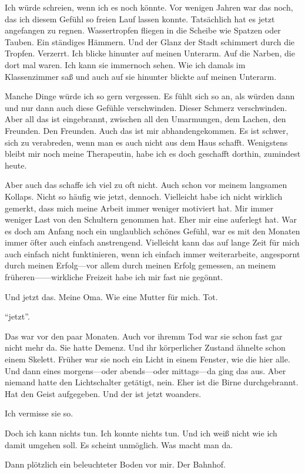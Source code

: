 \documentclass{article}
\begin{document}
	\medskip

	Ich würde schreien, wenn ich es noch könnte. Vor wenigen Jahren war das noch, das ich diesem Gefühl so freien Lauf lassen konnte. Tatsächlich hat es jetzt angefangen zu regnen. Wassertropfen fliegen in die Scheibe wie Spatzen oder Tauben. Ein ständiges Hämmern. Und der Glanz der Stadt schimmert durch die Tropfen. Verzerrt. Ich blicke hinunter auf meinen Unterarm. Auf die Narben, die dort mal waren. Ich kann sie immernoch sehen. Wie ich damals im Klassenzimmer saß und auch auf sie hinunter blickte auf meinen Unterarm.

	\medskip

	Manche Dinge würde ich so gern vergessen. Es fühlt sich so an, als würden dann und nur dann auch diese Gefühle verschwinden. Dieser Schmerz verschwinden. Aber all das ist eingebrannt, zwischen all den Umarmungen, dem Lachen, den Freunden. Den Freunden. Auch das ist mir abhandengekommen. Es ist schwer, sich zu verabreden, wenn man es auch nicht aus dem Haus schafft. Wenigstens bleibt mir noch meine Therapeutin, habe ich es doch geschafft dorthin, zumindest heute.

	\medskip

	Aber auch das schaffe ich viel zu oft nicht. Auch schon vor meinem langsamen Kollaps. Nicht so häufig wie jetzt, dennoch. Vielleicht habe ich nicht wirklich gemerkt, dass mich meine Arbeit immer weniger motiviert hat. Mir immer weniger Last von den Schultern genommen hat. Eher mir eine auferlegt hat. War es doch am Anfang noch ein unglaublich schönes Gefühl, war es mit den Monaten immer öfter auch einfach anstrengend. Vielleicht kann das auf lange Zeit für mich auch einfach nicht funktinieren, wenn ich einfach immer weiterarbeite, angespornt durch meinen Erfolg—vor allem durch meinen Erfolg gemessen, an meinem früheren——wirkliche Freizeit habe ich mir fast nie gegönnt.

	\medskip

	Und jetzt das. Meine Oma. Wie eine Mutter für mich. Tot. 

	\medskip

	\enquote{jetzt}.

	\medskip

	Das war vor den paar Monaten. Auch vor ihremm Tod war sie schon fast gar nicht mehr da. Sie hatte Demenz. Und ihr körperlicher Zustand ähnelte schon einem Skelett. Früher war sie noch ein Licht in einem Fenster, wie die hier alle. Und dann eines morgens—oder abends—oder mittags—da ging das aus. Aber niemand hatte den Lichtschalter getätigt, nein. Eher ist die Birne durchgebrannt. Hat den Geist aufgegeben. Und der ist jetzt woanders.

	\medskip

	Ich vermisse sie so.

	\medskip

	Doch ich kann nichts tun. Ich konnte nichts tun. Und ich weiß nicht wie ich damit umgehen soll. Es scheint unmöglich. Was macht man da.

	\medskip

	Dann plötzlich ein beleuchteter Boden vor mir. Der Bahnhof.
\end{document}
